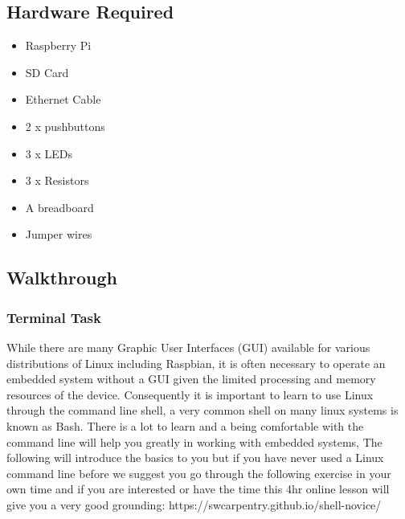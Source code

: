 \subsection{Hardware Required}
\begin{itemize}
    \item Raspberry Pi
    \item SD Card
    \item Ethernet Cable
    \item 2 x pushbuttons
    \item 3 x LEDs
    \item 3 x Resistors
    \item A breadboard
    \item Jumper wires
\end{itemize}

\subsection{Walkthrough}
\subsubsection{Terminal Task}
\label{sec:Prac1:Terminal}
While there are many Graphic User Interfaces (GUI) available for various distributions of Linux including Raspbian, it is often necessary to operate an embedded system without a GUI given the limited processing and memory resources of the device.  Consequently it is important to learn to use Linux through the command line shell, a very common shell on many linux systems is known as Bash.  There is a lot to learn and a being comfortable with the command line will help you greatly in working with embedded systems,  The following will introduce the basics to you but if you have never used a Linux command line before we suggest you go through the following exercise in your own time  and if you are interested or have the time this 4hr online lesson will give you a very good grounding: https://swcarpentry.github.io/shell-novice/

